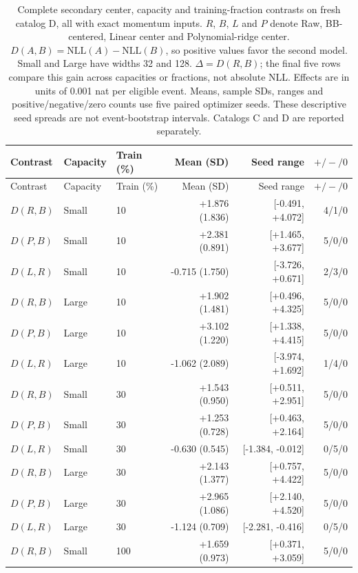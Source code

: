 \begingroup
\small
\setlength{\tabcolsep}{3pt}
\begin{longtable}{lllrrr}
\caption{Complete secondary center, capacity and training-fraction contrasts on fresh catalog D, all with exact momentum inputs. $R$, $B$, $L$ and $P$ denote Raw, BB-centered, Linear center and Polynomial-ridge center. $D(A,B)=\mathrm{NLL}(A)-\mathrm{NLL}(B)$, so positive values favor the second model. Small and Large have widths 32 and 128. $\Delta=D(R,B)$; the final five rows compare this gain across capacities or fractions, not absolute NLL. Effects are in units of 0.001 nat per eligible event. Means, sample SDs, ranges and positive/negative/zero counts use five paired optimizer seeds. These descriptive seed spreads are not event-bootstrap intervals. Catalogs C and D are reported separately.}\label{tab:editorial-secondary-current-D}\\
\toprule Contrast & Capacity & Train (\%) & Mean (SD) & Seed range & $+/-/0$\\ \midrule \endfirsthead
\toprule Contrast & Capacity & Train (\%) & Mean (SD) & Seed range & $+/-/0$\\ \midrule \endhead
$D(R,B)$ & Small & 10 & +1.876 (1.836) & [-0.491, +4.072] & 4/1/0\\
$D(P,B)$ & Small & 10 & +2.381 (0.891) & [+1.465, +3.677] & 5/0/0\\
$D(L,R)$ & Small & 10 & -0.715 (1.750) & [-3.726, +0.671] & 2/3/0\\
\midrule
$D(R,B)$ & Large & 10 & +1.902 (1.481) & [+0.496, +4.325] & 5/0/0\\
$D(P,B)$ & Large & 10 & +3.102 (1.220) & [+1.338, +4.415] & 5/0/0\\
$D(L,R)$ & Large & 10 & -1.062 (2.089) & [-3.974, +1.692] & 1/4/0\\
\midrule
$D(R,B)$ & Small & 30 & +1.543 (0.950) & [+0.511, +2.951] & 5/0/0\\
$D(P,B)$ & Small & 30 & +1.253 (0.728) & [+0.463, +2.164] & 5/0/0\\
$D(L,R)$ & Small & 30 & -0.630 (0.545) & [-1.384, -0.012] & 0/5/0\\
\midrule
$D(R,B)$ & Large & 30 & +2.143 (1.377) & [+0.757, +4.422] & 5/0/0\\
$D(P,B)$ & Large & 30 & +2.965 (1.086) & [+2.140, +4.520] & 5/0/0\\
$D(L,R)$ & Large & 30 & -1.124 (0.709) & [-2.281, -0.416] & 0/5/0\\
\midrule
$D(R,B)$ & Small & 100 & +1.659 (0.973) & [+0.371, +3.059] & 5/0/0\\

\end{longtable}
